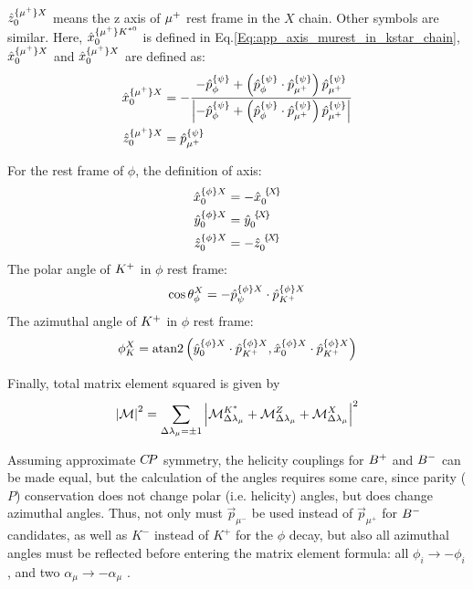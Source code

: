 $\hat{z}_0^{\{{\mu^+}\}X}$ means the z axis of ${\mu^+}$ rest frame in the $X$ chain. Other symbols are similar. 
Here, $\hat{x}_0^{\{{\mu^+}\}{{K}^{*0}}}$ is defined in Eq.\ref{Eq:app_axis_murest_in_kstar_chain}, $\hat{x}_0^{\{{\mu^+}\}X}$ and $\hat{x}_0^{\{{\mu^+}\}X}$ are defined as:
\begin{align}
\hat{x}_0^{\{\mup\}X} & = 
- \frac{ -\hat{p}_{\phi}^{\{\psi\}} + \left( \hat{p}_{\phi}^{\{\psi\}} \cdot 
\hat{p}_{\mup}^{\{\psi\}} \right) 
\hat{p}_{\mup}^{\{\psi\}} }
{\left| -\hat{p}_{\phi}^{\{\psi\}} + \left( \hat{p}_{\phi}^{\{\psi\}} \cdot 
\hat{p}_{\mup}^{\{\psi\}} \right) 
\hat{p}_{\mup}^{\{\psi\}}  \right|} \\ %
\hat{z}_0^{\{\mup\}X} & = \hat{p}_{\mup}^{\{\psi\}}
\end{align}

For the rest frame of $\phi$, the definition of axis:
\begin{align}
\hat{x}_{0}^{\{\phi\} X} & = - {\hat{x}}_{{0}}^{\,\,\{\!X\!\}}\\
\hat{y}_{0}^{\{\phi\} X} &= {\hat{y}}_{{0}}^{\,\,\{\!X\!\}}\\
\hat{z}_{0}^{\{\phi\} X} & = - {\hat{z}}_{{0}}^{\,\,\{\!X\!\}}
\end{align}
The polar angle of ${{K}^+}$ in $\phi$ rest frame:
\begin{equation}
\cos \theta_{\phi}^{X} = -\hat{p}_{\psi}^{\{\phi\}X} \cdot \hat{p}_{{{K}^+}}^{\{\phi\}X}
\end{equation}
The azimuthal angle of ${{K}^+}$ in $\phi$ rest frame:
\begin{equation}
\phi_{K}^{X} = \mathrm{atan2}  \left( \hat{y}_{0}^{\{\phi\}X} \cdot {\hat{p}}_{{{K}^+}}^{\{\phi\}X} , {\hat{x}}_{0}^{\{\phi\}X} \cdot {\hat{p}}_{{{K}^+}}^{\{\phi\}X} \right)
\end{equation}

Finally, total matrix element squared is given by
\begin{equation} 
\left| \mathcal{M} \right|^2  = 
\sum\limits_{\Delta\lambda_{\mu}=\pm1}
\left|
\mathcal{M}_{\Delta\lambda_\mu}^{{K^*}} 
+ 
\mathcal{M}_{\Delta\lambda_\mu}^{Z}  
+ \mathcal{M}_{\Delta\lambda_\mu}^{X} 
\right|^2
\label{SUPPeq:total_matrixelement}
\end{equation}  

Assuming approximate ${C\!P}$ symmetry, the helicity couplings for ${{{B}^+}}$ and ${{{B}^-}}$ can be made equal, 
but the calculation of the angles requires some care, 
since parity ($P$) conservation does not change polar (i.e. helicity) angles, 
but does change azimuthal angles. 
Thus, not only must $\vec{p}_{\mu^-}$ be used instead of $\vec{p}_{\mu^+}$ for ${{{B}^-}}$ candidates, 
as well as $K^-$ instead of $K^+$ for the $\phi$ decay,  
but also all azimuthal angles must be reflected before entering the matrix element formula:
all $\phi_{i}\to -\phi_{i}$,  
and 
two $\alpha_\mu\to -\alpha_\mu$
\supercite{Chilikin:2013tch}.


